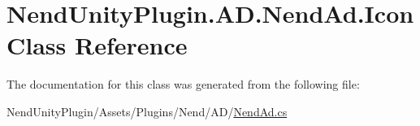\hypertarget{class_nend_unity_plugin_1_1_a_d_1_1_nend_ad_1_1_icon}{}\section{Nend\+Unity\+Plugin.\+A\+D.\+Nend\+Ad.\+Icon Class Reference}
\label{class_nend_unity_plugin_1_1_a_d_1_1_nend_ad_1_1_icon}


The documentation for this class was generated from the following file\+:\begin{DoxyCompactItemize}
\item 
Nend\+Unity\+Plugin/\+Assets/\+Plugins/\+Nend/\+A\+D/\hyperlink{_nend_ad_8cs}{Nend\+Ad.\+cs}\end{DoxyCompactItemize}
